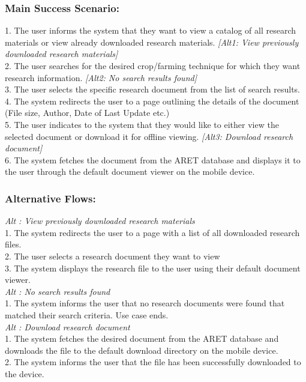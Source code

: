 \documentclass[12pt,letterpaper]{article}
\begin{document}
\subsubsection*{Main Success Scenario:}
1. The user informs the system that they want to view a catalog of all research materials or view already downloaded research materials. \emph{[Alt1: View previously downloaded research materials]}\\
2. The user searches for the desired crop/farming technique for which they want research information. \emph{[Alt2: No search results found]}\\
3. The user selects the specific research document from the list of search results.\\
4. The system redirects the user to a page outlining the details of the document (File size, Author, Date of Last Update etc.)\\
5. The user indicates to the system that they would like to either view the selected document or download it for offline viewing. \emph{[Alt3: Download research document]}\\
6. The system fetches the document from the ARET database and displays it to the user through the default document viewer on the mobile device.

\subsubsection*{Alternative Flows:}
\emph{Alt : View previously downloaded research materials}\\
1. The system redirects the user to a page with a list of all downloaded research files.\\
2. The user selects a research document they want to view\\
3. The system displays the research file to the user using their default document viewer.\\[10pt]
\emph{Alt : No search results found}\\
1. The system informs the user that no research documents were found that matched their search criteria. Use case ends. \\[10pt]
\emph{Alt : Download research document}\\
1. The system fetches the desired document from the ARET database and downloads the file to the default download directory on the mobile device.\\
2. The system informs the user that the file has been successfully downloaded to the device.
\end{document}
